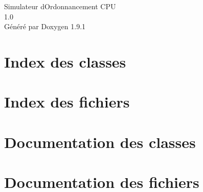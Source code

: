\let\mypdfximage\pdfximage\def\pdfximage{\immediate\mypdfximage}\documentclass[twoside]{book}
\newcommand{\+}{\discretionary{\mbox{\scriptsize$\hookleftarrow$}}{}{}}
\newcommand{\clearemptydoublepage}{%
  \newpage{\pagestyle{empty}\cleardoublepage}%
}
\begin{document}
\raggedbottom

\hypersetup{pageanchor=false,
             bookmarksnumbered=true,
             pdfencoding=unicode
            }
\begin{titlepage}
\vspace*{7cm}
\begin{center}%
{\Large Simulateur d\textquotesingle{}Ordonnancement CPU \\[1ex]\large 1.\+0 }\\
\vspace*{1cm}
{\large Généré par Doxygen 1.9.1}\\
\end{center}
\end{titlepage}
\clearemptydoublepage
{}
\tableofcontents
\clearemptydoublepage
{}
\hypersetup{pageanchor=true}

\chapter{Index des classes}

\chapter{Index des fichiers}

\chapter{Documentation des classes}




\chapter{Documentation des fichiers}













\backmatter
\newpage
{}
\clearemptydoublepage
{}
\printindex
\end{document}
